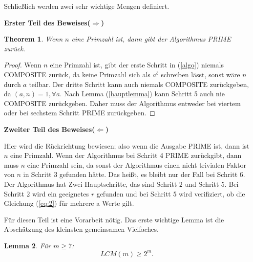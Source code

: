 \documentclass[12pt,oneside]{article}
\newtheorem{theorem}{Theorem}[section]
\newtheorem{lemma}[theorem]{Lemma}
\theoremstyle{remark}
\theoremstyle{definition}
\begin{document}
Schließlich werden zwei sehr wichtige Mengen definiert.%

\textbf{Erster Teil des Beweises($\Rightarrow$)}
\begin{theorem}
Wenn $n$ eine Primzahl ist, dann gibt der Algorithmus PRIME zurück.
\end{theorem}

\begin{proof}
Wenn $n$ eine Primzahl ist, gibt der erste Schritt in (\ref{algo}) niemals COMPOSITE zurück, da keine Primzahl sich als $a^b$ schreiben lässt, sonst wäre $n$ durch $a$ teilbar. Der dritte Schritt kann auch niemals COMPOSITE zurückgeben, da $(a,n) = 1, \forall a$. Nach Lemma (\ref{hauptlemma}) kann Schritt 5 auch nie COMPOSITE zurückgeben. Daher muss der Algorithmus entweder bei viertem oder bei sechstem Schritt PRIME zurückgeben.  
\end{proof}

\textbf{Zweiter Teil des Beweises($\Leftarrow$)}

Hier wird die Rückrichtung bewiesen; also  wenn die Ausgabe PRIME ist, dann ist $n$ eine Primzahl.
Wenn der Algorithmus bei Schritt 4 PRIME zurückgibt, dann muss $n$ eine Primzahl sein, da sonst der Algorithmus einen nicht trivialen Faktor von $n$ in Schritt 3 gefunden hätte. Das heißt, es bleibt nur der Fall bei Schritt 6. Der Algorithmus hat Zwei Hauptschritte, das sind Schritt 2 und Schritt 5. Bei Schritt 2 wird ein geeignetes $r$ gefunden und bei Schritt 5 wird verifiziert, ob die Gleichung (\ref{eq:2}) für mehrere a Werte gilt.    

Für diesen Teil ist eine Vorarbeit nötig. Das erste wichtige Lemma ist die Abschätzung des kleinsten gemeinsamen Vielfaches.


\begin{lemma}\label{lemma_1}
Für $m \geq 7$:\newline
\begin{equation}
    LCM(m) \geq 2^m.  
\end{equation}
\end{lemma}
\end{document}
